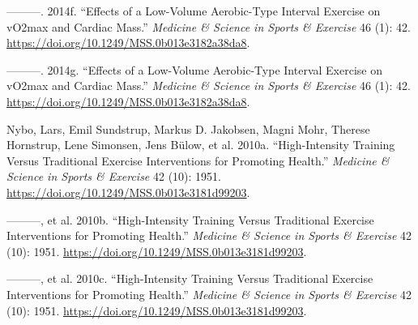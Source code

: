 \documentclass[
  letterpaper,
  DIV=11,
  numbers=noendperiod]{scrartcl}
\newlength{\cslhangindent}
\newlength{\cslentryspacingunit} %
\newenvironment{CSLReferences}[2] %
 {%
  \setlength{\parindent}{0pt}
  \ifodd #1
  \let\oldpar\par
  \def\par{\hangindent=\cslhangindent\oldpar}
  \fi
  \setlength{\parskip}{#2\cslentryspacingunit}
 }%
 {}
\begin{document}
\begin{CSLReferences}{1}{0}
\leavevmode{}%
---------. 2014f. {``Effects of a Low-Volume Aerobic-Type Interval
Exercise on v{\textperiodcentered}O2max and Cardiac Mass.''}
\emph{Medicine \& Science in Sports \& Exercise} 46 (1): 42.
\url{https://doi.org/10.1249/MSS.0b013e3182a38da8}.

\leavevmode{}%
---------. 2014g. {``Effects of a Low-Volume Aerobic-Type Interval
Exercise on v{\textperiodcentered}O2max and Cardiac Mass.''}
\emph{Medicine \& Science in Sports \& Exercise} 46 (1): 42.
\url{https://doi.org/10.1249/MSS.0b013e3182a38da8}.

\leavevmode{}%
Nybo, Lars, Emil Sundstrup, Markus D. Jakobsen, Magni Mohr, Therese
Hornstrup, Lene Simonsen, Jens Bülow, et al. 2010a. {``High-Intensity
Training Versus Traditional Exercise Interventions for Promoting
Health.''} \emph{Medicine \& Science in Sports \& Exercise} 42 (10):
1951. \url{https://doi.org/10.1249/MSS.0b013e3181d99203}.

\leavevmode{}%
---------, et al. 2010b. {``High-Intensity Training Versus Traditional
Exercise Interventions for Promoting Health.''} \emph{Medicine \&
Science in Sports \& Exercise} 42 (10): 1951.
\url{https://doi.org/10.1249/MSS.0b013e3181d99203}.

\leavevmode{}%
---------, et al. 2010c. {``High-Intensity Training Versus Traditional
Exercise Interventions for Promoting Health.''} \emph{Medicine \&
Science in Sports \& Exercise} 42 (10): 1951.
\url{https://doi.org/10.1249/MSS.0b013e3181d99203}.

\end{CSLReferences}
\end{document}
